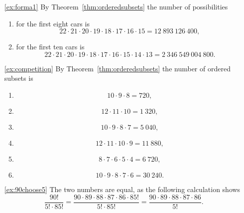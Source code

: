 \begin{enumerate}
\item[\ref{ex:forma1}]
By Theorem~\ref{thm:orderedsubsets} the number of possibilities 
\begin{enumerate}
\item
for the first eight cars is
\[
22 \cdot 21 \cdot 20 \cdot 19 \cdot 18 \cdot 17 \cdot 16 \cdot 15 = 12~893~126~400,
\]

\item
for the first ten cars is
\[
22 \cdot 21 \cdot 20 \cdot 19 \cdot 18 \cdot 17 \cdot 16 \cdot 15 \cdot 14 \cdot 13 = 2~346~549~004~800.
\]
\end{enumerate}

\item[\ref{ex:competition}]
By Theorem~\ref{thm:orderedsubsets} the number of ordered subsets is
\begin{enumerate}
\item
\[
10 \cdot 9 \cdot 8 = 720, 
\]

\item
\[
12 \cdot 11 \cdot 10 = 1~320, 
\]

\item
\[
10 \cdot 9 \cdot 8 \cdot 7 = 5~040, 
\]

\item
\[
12 \cdot 11 \cdot 10 \cdot 9 = 11~880, 
\]

\item
\[
8 \cdot 7 \cdot 6 \cdot 5 \cdot 4 = 6~720, 
\]

\item
\[
10 \cdot 9 \cdot 8 \cdot 7 \cdot 6= 30~240. 
\]
\end{enumerate}


\item[\ref{ex:90choose5}]
The two numbers are equal, as the following calculation shows
\[
\frac{90!}{5! \cdot 85!} = \frac{90 \cdot 89 \cdot 88 \cdot 87 \cdot 86 \cdot 85!}{5! \cdot 85!} = \frac{90 \cdot 89 \cdot 88 \cdot 87 \cdot 86}{5!}.
\]



\end{enumerate}
